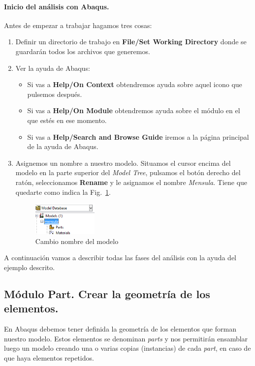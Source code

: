 \paragraph{Inicio del análisis con Abaqus.} Antes de empezar a
trabajar hagamos tres cosas:
\begin{enumerate}
\item Definir un directorio de trabajo en \textbf{File/Set Working
    Directory} donde se guardarán todos los archivos que generemos.
\item Ver la ayuda de Abaqus:
  \begin{itemize}
  \item Si vas a \textbf{Help/On Context} obtendremos ayuda sobre
    aquel icono que pulsemos después.
  \item Si vas a \textbf{Help/On Module} obtendremos ayuda sobre el
    módulo en el que estés en ese momento.
  \item Si vas a \textbf{Help/Search and Browse Guide} iremos a la
    página principal de la ayuda de Abaqus.
  \end{itemize}
\item Asignemos un nombre a nuestro modelo.  Situamos el cursor encima
  del modelo en la parte superior del \textit{Model Tree}, pulsamos el
  botón derecho del ratón, seleccionamos \textbf{Rename} y le
  asignamos el nombre \textit{Mensula}. Tiene que quedarte como indica
  la Fig.~\ref{figu12}.
  \begin{figure}[H]
    \begin{center}
      \includegraphics[width=0.3\textwidth]{./body/images/imagen12}
    \end{center}
    \caption{Cambio nombre del modelo}
    \label{figu12}
  \end{figure}
\end{enumerate}

A continuación vamos a describir todas las fases del análisis con la
ayuda del ejemplo descrito.
\clearpage

\subsection{Módulo Part. Crear la geometría de los elementos.}
En Abaqus debemos tener definida la geometría de los elementos que
forman nuestro modelo. Estos elementos se denominan \textit{parts} y
nos permitirán ensamblar luego un modelo creando una o varias copias
(instancias) de cada \textit{part}, en caso de que haya elementos
repetidos.


